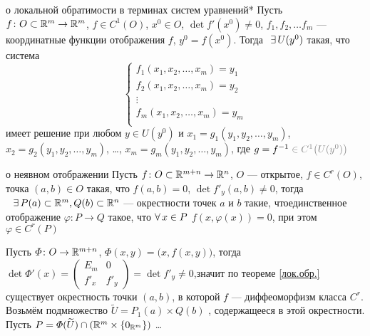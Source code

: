 \begin{teor}[https://www.youtube.com/live/g4Zgeu8xe-Q?si=dyQKDlOGFnTn7A1c&t=1101]{о локальной обратимости в терминах систем уравнений}*%
	Пусть $f \colon O \subset \mathbb R^m \to \mathbb R^m$, $f \in C^1(O)$, $x^0 \in O$, $\det f'(x^0) \ne 0$, $f_1, f_2, \ldots f_m$ --- координатные функции отображения $f$, $y^0 = f(x^0)$. Тогда$\E U(y^0)$ такая, что система
	\[\begin{cases}
		f_1(x_1, x_2, \ldots, x_m) = y_1 \\
		f_2(x_1, x_2, \ldots, x_m) = y_2 \\
		\vdots \\
		f_m(x_1, x_2, \ldots, x_m) = y_m \\
	\end{cases}\]
	имеет решение при любом $y \in U(y^0)$ и $x_1 = g_1 (y_1, y_2, \ldots, y_m)$, $x_2 = g_2 (y_1, y_2, \ldots, y_m)$, \dots, $x_m = g_m (y_1, y_2, \ldots, y_m)$, где $g = f^{-1} \uns{{}\in C^1\bigl(U(y^0)\bigr)}$ 
\end{teor}

\begin{teor}{о неявном отображении}
	Пусть $f \colon O \subset \mathbb R^{m+n} \to \mathbb R^n$, $O$ --- открытое, $f \in C^r(O)$, точка $(a, b) \in O$ такая, что $f(a, b) = 0$, $\det f'_y(a, b) \ne 0$, тогда$\E P(a) \subset \rmm, Q(b) \subset \rr^n$ --- окрестности точек $a$ и $b$ такие, что\E единствен\-ное отображение $\varphi \colon P \to Q$ такое, что $\forall \, x \in P$ $f(x, \varphi(x)) = 0$, при этом $\varphi \in C^r(P)$
\end{teor}

\begin{prf}
	Пусть $\varPhi \colon O \to \mathbb R^{m+n}$\!, $\varPhi(x, y) = \bigl(x, f(x, y)\bigr)$, тогда $\det \varPhi'(x) = \! \begin{pmatrix}
		\! E_m & 0 \\ \! f'_x & f'_y
	\end{pmatrix}\! = \det f'_y \ne 0$,\linebreak значит по теореме \ref{лок.обр.} существует окрестность точки $(a, b)$, в которой $f$ --- диффеоморфизм класса $C^r$. Возьмём подмножество $\widetilde U = P_1(a) \times Q(b)$ , содержащееся в этой окрестности. Пусть $P = \varPhi(\widetilde U) \cap (\mathbb R^m \times \{0_{\mathbb R^m}\})$ \dots
\end{prf}